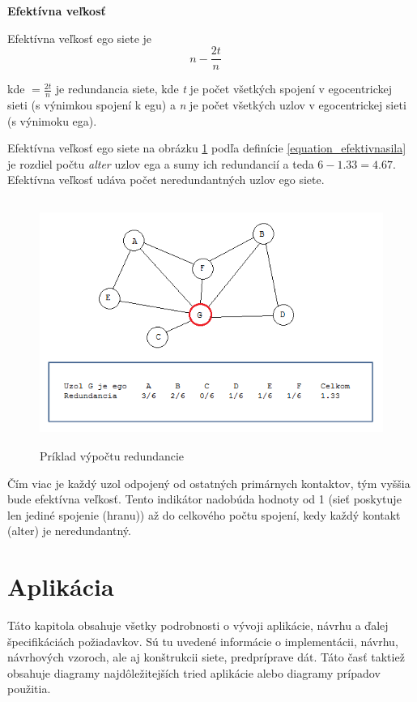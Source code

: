 \documentclass[slovak,master,public,dept460,male,cpdeclaration,oneside]{diploma}
\begin{document}
\noindent \textbf{Efektívna veľkosť} 

\begin{definition}
Efektívna veľkosť ego siete je
\begin{equation}
{ { n - \frac{2t}{n}}}\quad 
\end{equation}
\label{equation_efektivnasila}
\end{definition}
kde ${ = \frac{2t}{n}}$ je redundancia siete, kde \textit{t} je počet všetkých spojení v egocentrickej sieti (s výnimkou spojení k egu) a \textit{n} je počet všetkých uzlov v egocentrickej sieti (s výnimoku ega). \cite{borgatti1997structural}

Efektívna veľkosť ego siete na obrázku \ref{efectivesize} podľa definície \ref{equation_efektivnasila} je rozdiel počtu \textit{alter} uzlov ega a sumy ich redundancií a teda ${6-1.33 = 4.67}$. Efektívna veľkosť udáva počet neredundantných uzlov ego siete. \cite{22}


\begin{figure}[H]
\centering
\includegraphics[width=13cm, height=8cm]{figures/efectivesize}
\caption{Príklad výpočtu redundancie}
\label{efectivesize}
\end{figure}

Čím viac je každý uzol odpojený od ostatných primárnych kontaktov, tým vyššia bude efektívna veľkosť. Tento indikátor nadobúda hodnoty od 1 (sieť poskytuje len jediné spojenie (hranu)) až do celkového počtu spojení, kedy každý kontakt (alter) je neredundantný. \cite{22}

\section{Aplikácia}
Táto kapitola obsahuje všetky podrobnosti o vývoji aplikácie, návrhu a ďalej špecifikáciách požiadavkov. Sú tu uvedené informácie o implementácii, návrhu, návrhových vzoroch, ale aj  konštrukcii siete, predpríprave dát. Táto časť taktiež obsahuje diagramy najdôležitejších tried aplikácie alebo diagramy prípadov použitia. 
\end{document}
